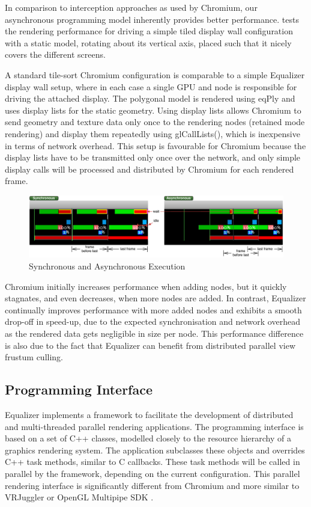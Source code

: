 In comparison to interception approaches as used by Chromium, our asynchronous
programming model inherently provides better performance.  tests
the rendering performance for driving a simple tiled display wall configuration
with a static model, rotating about its vertical axis, placed such that it
nicely covers the different screens.

A standard tile-sort Chromium configuration is comparable to a simple Equalizer
display wall setup, where in each case a single GPU and node is responsible for
driving the attached display. The polygonal model is rendered using eqPly and
uses display lists for the static geometry. Using display lists allows Chromium
to send geometry and texture data only once to the rendering nodes (retained mode
rendering) and display them repeatedly using \textsf{glCallLists()}, which is
inexpensive in terms of network overhead. This setup is favourable for Chromium
because the display lists have to be transmitted only once over the network,
and only simple display calls will be processed and distributed by Chromium for
each rendered frame.

\begin{figure}[h!t]\center
 \includegraphics[width=\textwidth]{images/syncAsync}
 {\caption{\label{fSyncAsync}Synchronous and Asynchronous Execution}}
\end{figure}

Chromium initially increases performance when adding nodes, but it quickly
stagnates, and even decreases, when more nodes are added. In contrast, Equalizer
continually improves performance with more added nodes and exhibits a smooth
drop-off in speed-up, due to the expected synchronisation and network overhead
as the rendered data gets negligible in size per node. This performance
difference is also due to the fact that Equalizer can benefit from distributed
parallel view frustum culling.


\subsection{Programming Interface}

Equalizer implements a framework to facilitate the development of distributed and
multi-threaded parallel rendering applications. The programming interface is
based on a set of C++ classes, modelled closely to the resource hierarchy of a
graphics rendering system. The application subclasses these objects and
overrides C++ task methods, similar to C callbacks. These task methods will be
called in parallel by the framework, depending on the current configuration.
This parallel rendering interface is significantly different from Chromium
\cite{HHNFAKK:02} and more similar to VRJuggler \cite{BJHMBC:01} or OpenGL
Multipipe SDK \cite{BRE:05}.

